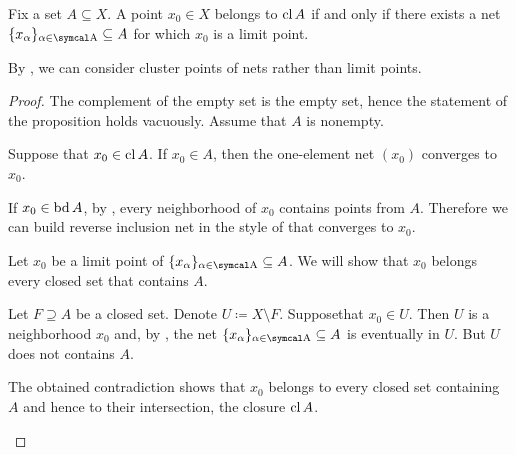 \begin{proposition}\label{thm:limit_point_iff_in_closure}\cite[proposition 1.6.3]{Engelking1989}
  Fix a set \( A \subseteq X \). A point \( x_0 \in X \) belongs to \( \operatorname{cl}{A} \) if and only if there exists a net \( \{ x_\al \}_{\al \in \CA} \subseteq A \) for which \( x_0 \) is a limit point.

  By , we can consider cluster points of nets rather than limit points.
\end{proposition}
\begin{proof}
  The complement of the empty set is the empty set, hence the statement of the proposition holds vacuously. Assume that \( A \) is nonempty.

  \begin{description}
    \Implies Suppose that \( x_0 \in \operatorname{cl}{A} \). If \( x_0 \in A \), then the one-element net \( (x_0) \) converges to \( x_0 \).

    If \( x_0 \in \operatorname{bd}{A} \), by , every neighborhood of \( x_0 \) contains points from \( A \). Therefore we can build reverse inclusion net in the style of  that converges to \( x_0 \).

    \ImpliedBy Let \( x_0 \) be a limit point of \( \{ x_\al \}_{\al \in \CA} \subseteq A \). We will show that \( x_0 \) belongs every closed set that contains \( A \).

    Let \( F \supseteq A \) be a closed set. Denote \( U \coloneqq X \setminus F \). Suppose\LEM that \( x_0 \in U \). Then \( U \) is a neighborhood \( x_0 \) and, by , the net \( \{ x_\al \}_{\al \in \CA} \subseteq A \) is eventually in \( U \). But \( U \) does not contains \( A \).

    The obtained contradiction shows that \( x_0 \) belongs to every closed set containing \( A \) and hence to their intersection, the closure \( \operatorname{cl} A \).
  \end{description}
\end{proof}

